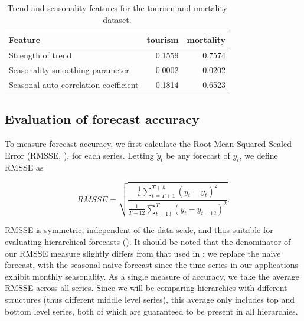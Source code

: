 \documentclass[a4paper,review,12pt,authoryear]{elsarticle}
\begin{document}
\begin{table}[h!]
    \centering
    \caption{\label{tab:features}Trend and seasonality features for the tourism  and mortality dataset.}
    \begin{tabular}{lrr}\toprule
        Feature & tourism &  mortality\\ \midrule
        Strength of trend & 0.1559 & 0.7574 \\
        Seasonality smoothing parameter & 0.0002 & 0.0202 \\ 
        Seasonal auto-correlation coefficient &0.1814  &0.6523  \\ 
 \bottomrule
    \end{tabular}
\end{table}


\subsection{Evaluation of forecast accuracy}
\label{subsec:evaluation}

To measure forecast accuracy, we first calculate the Root Mean Squared Scaled Error (RMSSE, \citealp{makridakisM5AccuracyCompetition2022}), for each series. Letting $\breve y_t$ be any forecast of $y_t$, we define RMSSE as

\[
RMSSE = \sqrt{\frac{\frac{1}{h}\displaystyle\sum_{t=T+1}^{T+h}(y_t-\breve y_{t})^2}{\frac{1}{T-12}\displaystyle\sum_{t=13}^T (y_t - y_{t-12})^2}} .
\]

RMSSE is symmetric, independent of the data scale, and thus suitable for evaluating hierarchical forecasts (\citealp{athanasopoulosEvaluationHierarchicalForecasts2023}). It should be noted that the denominator of our RMSSE measure slightly differs from that used in \cite{makridakisM5AccuracyCompetition2022}; we replace the naive forecast, with the seasonal naive forecast since the time series in our applications exhibit monthly seasonality. 
As a single measure of accuracy, we take the average RMSSE across all series. Since we will be comparing hierarchies with different structures (thus different middle level series), this average only includes top and bottom level series, both of which are guaranteed to be present in all hierarchies.
\end{document}
